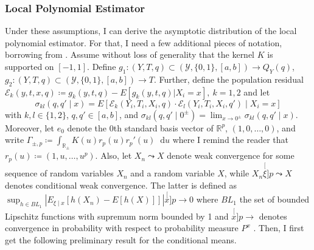 \documentclass[12pt]{article}
\newcommand*\dd{\mathop{}\!\mathrm{d}}
\begin{document}
\subsubsection{Local Polynomial Estimator} \label{sec:asymptotic_local_polynomial}
Under these assumptions, I can derive the asymptotic distribution of the local polynomial estimator. For that, I need a few additional pieces of notation, borrowing from \citet{chiang2019robust}. Assume without loss of generality that the kernel $K$ is supported on $[-1,1]$. Define $g_1: (Y, T, q) \subset (\mathcal{Y}, \{0,1\}, [a,b]) \to Q_Y(q)$, $g_2 : (Y, T, q) \subset  (\mathcal{Y}, \{0,1\}, [a,b]) \to T$. Further, define the population residual $\mathcal{E}_k(y, t, x, q) \coloneqq g_k(y, t, q) - E[g_k(y, t, q) | X_i=x], \: k={1,2}$ and let 
\[ \sigma_{k l}(q, q' \mid x)=E\left[\mathcal{E}_k\left(Y_i, T_i, X_i, q\right) \cdot \mathcal{E}_l\left(Y_i, T_i, X_i, q'\right) \mid X_i=x\right] \] 
with $k,l \in \{1,2\}$, $q,q' \in [a,b]$, and $\sigma_{kl}(q, q' \mid 0^{\pm}) = \lim_{x \to 0^{\pm}} \sigma_{k l}(q, q' \mid x)$.
Moreover, let $e_0$ denote the $0$th standard basis vector of $\mathbb{R}^p$, $(1, 0, \ldots ,0)$, and write $\Gamma_{\pm, p} \coloneqq \int_{\mathbb{R}_{\pm}} K(u) r_p(u) r_p'(u) \dd u$ where I remind the reader that $r_p(u) \coloneqq (1, u, \ldots, u^p)$. Also, let $X_n \leadsto X$ denote weak convergence for some sequence of random variables $X_n$ and a random variable $X$, while $X_n \stackrel[\xi]{p}{\leadsto} X$ denotes conditional weak convergence. The latter is defined as $\sup_{h \in BL_1} \left| E_{\xi \mid x}\left[ h(X_n) - E[h(X)] \right] \right| \stackrel[x]{p}{\to} 0$ where $BL_1$ the set of bounded Lipschitz functions with supremum norm bounded by 1 and $\stackrel[x]{p}{\to}$ denotes convergence in probability with respect to probability measure $P^x$ \citep[\S 1.13]{vaart1996weak}. Then, I first get the following preliminary result for the conditional means.
\end{document}

